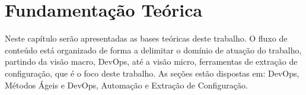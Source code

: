 \newpage\null\thispagestyle{empty}\newpage
\chapter{Fundamentação Teórica}
\label{chap:teoria}

Neste capítulo serão apresentadas as bases teóricas deste trabalho.
O fluxo de conteúdo está organizado de forma a delimitar o domínio de atuação
do trabalho, partindo da visão macro, DevOps, até a visão micro, ferramentas de
extração de configuração, que é o foco deste trabalho. As seções estão dispostas em:
DevOps, Métodos Ágeis e DevOps, Automação e Extração de Configuração.





